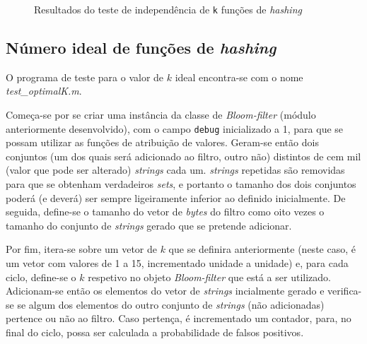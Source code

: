 \documentclass[a4paper,11pt,openright,oneside]{report}
\begin{document}
\begin{figure}[ht]	
\center
{}
\caption{Resultados do teste de independência de \texttt{k} funções de \textit{hashing}}
\label{fig:hashindep}
\end{figure}

\subsection{Número ideal de funções de \textit{hashing}}
\label{subsec.optimalk}

O programa de teste para o valor de $k$ ideal encontra-se com o nome \textit{test\_optimalK.m}.

Começa-se por se criar uma instância da classe de \textit{Bloom-filter} (módulo anteriormente desenvolvido), com o campo \texttt{debug} inicializado a 1, para que se possam utilizar as funções de atribuição de valores. Geram-se então dois conjuntos (um dos quais será adicionado ao filtro, outro não) distintos de cem mil (valor que pode ser alterado) \textit{strings} cada um. \textit{strings} repetidas são removidas para que se obtenham verdadeiros \textit{sets}, e portanto o tamanho dos dois conjuntos poderá (e deverá) ser sempre ligeiramente inferior ao definido inicialmente. De seguida, define-se o tamanho do vetor de \textit{bytes} do filtro como oito vezes o tamanho do conjunto de \textit{strings} gerado que se pretende adicionar.

Por fim, itera-se sobre um vetor de $k$ que se definira anteriormente (neste caso, é um vetor com valores de 1 a 15, incrementado unidade a unidade) e, para cada ciclo, define-se o $k$ respetivo no objeto \textit{Bloom-filter} que está a ser utilizado. Adicionam-se então os elementos do vetor de \textit{strings} incialmente gerado e verifica-se se algum dos elementos do outro conjunto de \textit{strings} (não adicionadas) pertence ou não ao filtro. Caso pertença, é incrementado um contador, para, no final do ciclo, possa ser calculada a probabilidade de falsos positivos.
\end{document}
